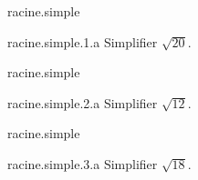 
\begin{qcm}{racine.simple}
    \begin{question}{racine.simple.1.a}
         Simplifier \(\sqrt{20}\).
         \vspace{-1.5ex}
         \begin{multicols}{3}
         \begin{reponses}
         \end{reponses}
         \end{multicols}
    \end{question}
\end{qcm}

\begin{qcm}{racine.simple}
    \begin{question}{racine.simple.2.a}
         Simplifier \(\sqrt{12}\).
         \vspace{-1.5ex}
         \begin{multicols}{3}
         \begin{reponses}
         \end{reponses}
         \end{multicols}
    \end{question}
\end{qcm}

\begin{qcm}{racine.simple}
    \begin{question}{racine.simple.3.a}
         Simplifier \(\sqrt{18}\).
         \vspace{-1.5ex}
         \begin{multicols}{3}
         \begin{reponses}
         \end{reponses}
         \end{multicols}
    \end{question}
\end{qcm}



